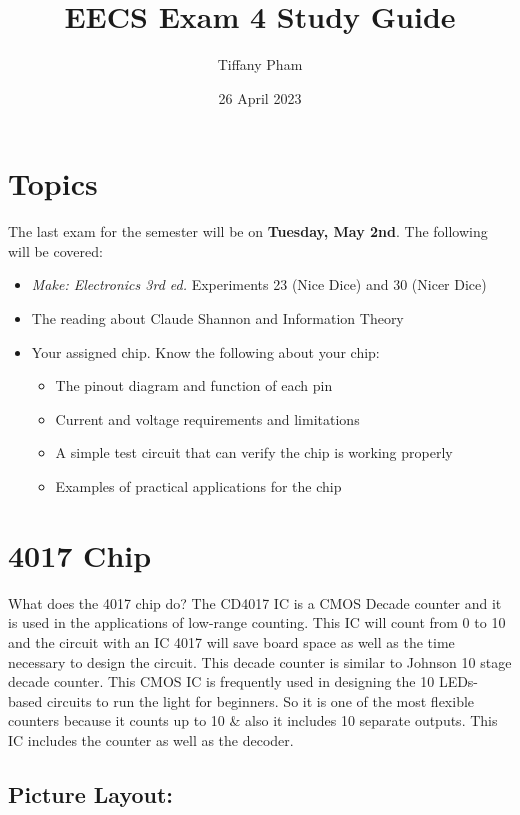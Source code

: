 \documentclass[pstricks,border=11pt]{article}
\title{EECS Exam 4 Study Guide}
\author{Tiffany Pham}
\date{26 April 2023}
\begin{document}
\maketitle

\section{Topics}
The last exam for the semester will be on \textbf{Tuesday, May 2nd}. The following will be covered:
\begin{itemize}
    \item \textit{Make: Electronics 3rd ed.} Experiments 23 (Nice Dice) and 30 (Nicer Dice)
    \item The reading about Claude Shannon and Information Theory
    \item Your assigned chip. Know the following about your chip:
    \begin{itemize}
        \item []The pinout diagram and function of each pin
        \item []Current and voltage requirements and limitations
        \item []A simple test circuit that can verify the chip is working properly
        \item []Examples of practical applications for the chip
    \end{itemize}
\end{itemize}

\section{4017 Chip}
What does the 4017 chip do?
\hfill \break
The CD4017 IC is a CMOS Decade counter and it is used in the applications of low-range counting. This IC will count from 0 to 10 and the circuit with an IC 4017 will save board space as well as the time necessary to design the circuit. This decade counter is similar to Johnson 10 stage decade counter. This CMOS IC is frequently used in designing the 10 LEDs-based circuits to run the light for beginners. So it is one of the most flexible counters because it counts up to 10 \& also it includes 10 separate outputs. This IC includes the counter as well as the decoder.

\hfill \break
\subsection{Picture Layout:}
\end{document}
